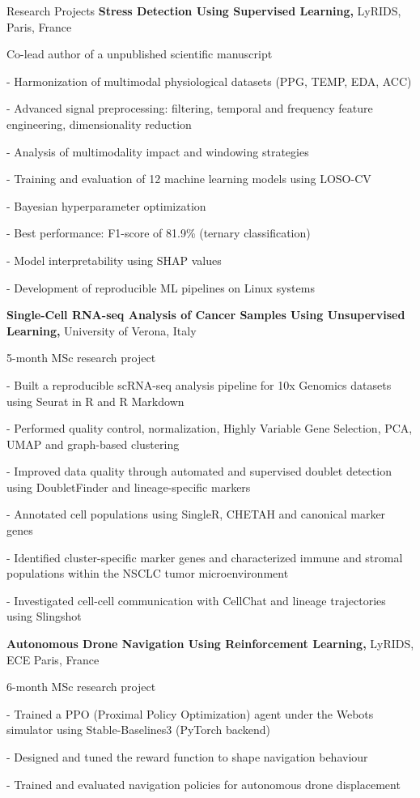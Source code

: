 \begin{rubric}{Research Projects}
\entry*[2023 -- 2025]
\textbf{Stress Detection Using Supervised Learning,} LyRIDS, Paris, France\par
Co-lead author of a unpublished scientific manuscript\par
- Harmonization of multimodal physiological datasets (PPG, TEMP, EDA, ACC)\par
- Advanced signal preprocessing: filtering, temporal and frequency feature engineering, dimensionality reduction\par
- Analysis of multimodality impact and windowing strategies\par
- Training and evaluation of 12 machine learning models using LOSO-CV\par
- Bayesian hyperparameter optimization\par
- Best performance: F1-score of 81.9\% (ternary classification)\par
- Model interpretability using SHAP values\par
- Development of reproducible ML pipelines on Linux systems

\entry*[2024]
\textbf{Single-Cell RNA-seq Analysis of Cancer Samples Using Unsupervised Learning,} University of Verona, Italy\par
5-month MSc research project\par
- Built a reproducible scRNA-seq analysis pipeline for 10x Genomics datasets using Seurat in R and R Markdown\par
- Performed quality control, normalization, Highly Variable Gene Selection, PCA, UMAP and graph-based clustering\par
- Improved data quality through automated and supervised doublet detection using DoubletFinder and lineage-specific markers\par
- Annotated cell populations using SingleR, CHETAH and canonical marker genes\par
- Identified cluster-specific marker genes and characterized immune and stromal populations within the NSCLC tumor microenvironment\par
- Investigated cell-cell communication with CellChat and lineage trajectories using Slingshot

\entry*[2024]
\textbf{Autonomous Drone Navigation Using Reinforcement Learning,} LyRIDS, ECE Paris, France\par
6-month MSc research project\par
- Trained a PPO (Proximal Policy Optimization) agent under the Webots simulator using Stable-Baselines3 (PyTorch backend)\par
- Designed and tuned the reward function to shape navigation behaviour\par
- Trained and evaluated navigation policies for autonomous drone displacement


\end{rubric}
